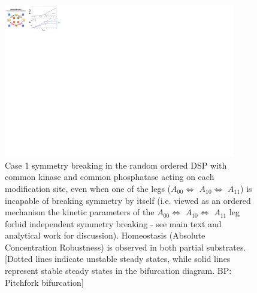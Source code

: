 \documentclass[9pt,lineno]{elife}
\begin{document}
\clearpage
\begin{figure}[ht!]
    \centering
    \includegraphics[width = 0.9\textwidth, keepaspectratio]{FigS03.pdf}
    \caption{Case 1 symmetry breaking in the random ordered DSP with common kinase and common phosphatase acting on each modification site, even when one of the legs ($A_{00} \Longleftrightarrow$ $A_{10} \Longleftrightarrow$ $A_{11}$) is incapable of breaking symmetry by itself (i.e. viewed as an ordered mechanism the kinetic parameters of the $A_{00} \Longleftrightarrow$ $A_{10} \Longleftrightarrow$ $A_{11}$ leg forbid independent symmetry breaking - see main text and analytical work for discussion). Homeostasis (Absolute Concentration Robustness) is observed in both partial substrates.
    [Dotted lines indicate unstable steady states, while solid lines represent stable steady states in the bifurcation diagram. BP: Pitchfork bifurcation]}
    \label{Fig S3}
\end{figure}
\end{document}
